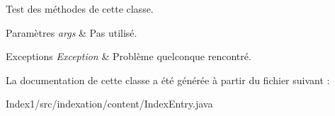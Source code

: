 Test des méthodes de cette classe.


\begin{DoxyParams}{Paramètres}
{\em args} & Pas utilisé.\\
\hline
\end{DoxyParams}

\begin{DoxyExceptions}{Exceptions}
{\em Exception} & Problème quelconque rencontré. \\
\hline
\end{DoxyExceptions}


La documentation de cette classe a été générée à partir du fichier suivant \+:\begin{DoxyCompactItemize}
\item 
Index1/src/indexation/content/Index\+Entry.\+java\end{DoxyCompactItemize}
